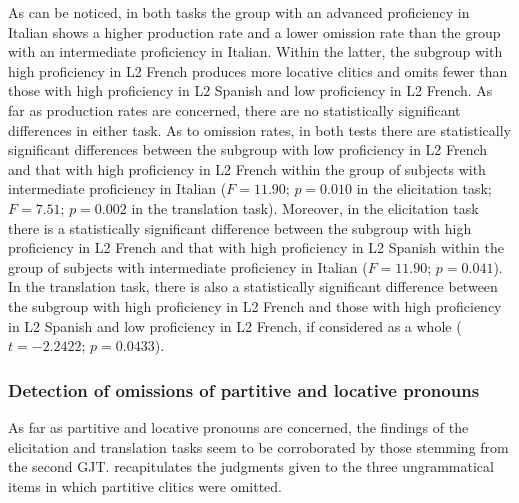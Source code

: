 \documentclass[output=paper,modfonts,nonflat,newtxmath]{langsci/langscibook}
\begin{document}
As can be noticed, in both tasks the group with an advanced proficiency in Italian shows a higher production rate and a lower omission rate than the group with an intermediate proficiency in Italian. Within the latter, the subgroup with high proficiency in L2 French produces more locative clitics and omits fewer than those with high proficiency in L2 Spanish and low proficiency in L2 French. As far as production rates are concerned, there are no statistically significant differences in either task. As to omission rates, in both tests there are statistically significant differences between the subgroup with low proficiency in L2 French and that with high proficiency in L2 French within the group of subjects with intermediate proficiency in Italian ($F = 11.90$; $p = 0.010$ in the elicitation task; $F = 7.51$; $p = 0.002$ in the translation task). Moreover, in the elicitation task there is a statistically significant difference between the subgroup with high proficiency in L2 French and that with high proficiency in L2 Spanish within the group of subjects with intermediate proficiency in Italian ($F = 11.90$; $p = 0.041$). In the translation task, there is also a statistically significant difference between the subgroup with high proficiency in L2 French and those with high proficiency in L2 Spanish and low proficiency in L2 French, if considered as a whole ($t = -2.2422$; $p = 0.0433$).

\subsubsection{Detection of omissions of partitive and locative pronouns} %

As far as partitive and locative pronouns are concerned, the findings of the elicitation and translation tasks seem to be corroborated by those stemming from the second GJT.  recapitulates the judgments given to the three ungrammatical items in which partitive clitics were omitted.

\begin{table}
\caption{\label{tab:sciutti:4}Judgments on items including an omission of a partitive clitic (ungrammatical)}
\end{table}
\end{document}
